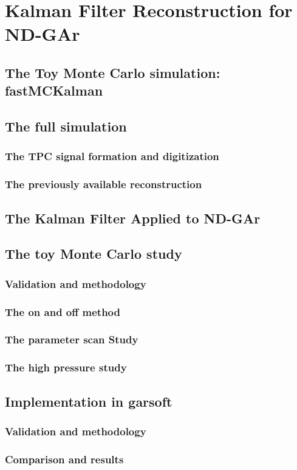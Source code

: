 \begin{savequote}[8cm]
\end{savequote}

\chapter{\label{ch:5-KF-NDGArToy}Kalman Filter Reconstruction for ND-GAr}

\minitoc

\section{The Toy Monte Carlo simulation: fastMCKalman}
\section{The full simulation}
\subsection{The TPC signal formation and digitization}
\subsection{The previously available reconstruction}
\section{The Kalman Filter Applied to ND-GAr}
\section{The toy Monte Carlo study}
\subsection{Validation and methodology}
\subsection{The on and off method}
\subsection{The parameter scan Study}
\subsection{The high pressure study}
\section{Implementation in garsoft}
\subsection{Validation and methodology}
\subsection{Comparison and results}
